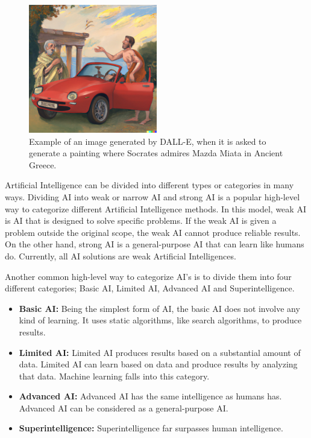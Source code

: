 \begin{figure}
\centering \includegraphics[width=0.5\textwidth]{img/dalle}
\caption{Example of an image generated by DALL-E, when it is asked to generate a painting where Socrates admires Mazda Miata in Ancient Greece.}
\label{img:dalle} 
\end{figure}

Artificial Intelligence can be divided into different types or categories in many ways. Dividing AI into weak or narrow AI and strong AI is a popular high-level way to categorize different Artificial Intelligence methods. In this model, weak AI is AI that is designed to solve specific problems. If the weak AI is given a problem outside the original scope, the weak AI cannot produce reliable results. On the other hand, strong AI is a general-purpose AI that can learn like humans do. Currently, all AI solutions are weak Artificial Intelligences.

Another common high-level way to categorize AI's is to divide them into four different categories; Basic AI, Limited AI, Advanced AI and Superintelligence.

\begin{itemize}
  \item \textbf{Basic AI:} Being the simplest form of AI, the basic AI does not involve any kind of learning. It uses static algorithms, like search algorithms, to produce results.
  \item \textbf{Limited AI:} Limited AI produces results based on a substantial amount of data. Limited AI can learn based on data and produce results by analyzing that data. Machine learning falls into this category.
  \item \textbf{Advanced AI:} Advanced AI has the same intelligence as humans has. Advanced AI can be considered as a general-purpose AI. 
  \item \textbf{Superintelligence:} Superintelligence far surpasses human intelligence.
\end{itemize}

